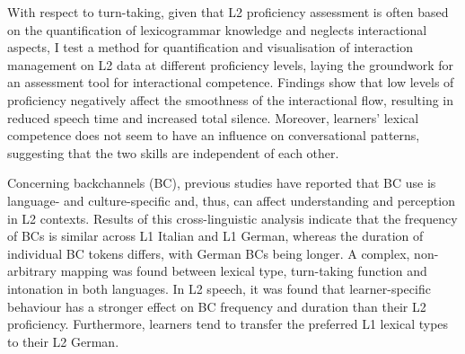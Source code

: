 \begin{stylelsAbstract}
With respect to turn-taking, given that L2 proficiency assessment is often based on the quantification of lexicogrammar knowledge and neglects interactional aspects, I test a method for quantification and visualisation of interaction management on L2 data at different proficiency levels, laying the groundwork for an assessment tool for interactional competence. Findings show that low levels of proficiency negatively affect the smoothness of the interactional flow, resulting in reduced speech time and increased total silence. Moreover, learners’ lexical competence does not seem to have an influence on conversational patterns, suggesting that the two skills are independent of each other.
\end{stylelsAbstract}

\begin{stylelsAbstract}
Concerning backchannels (BC), previous studies have reported that BC use is language- and culture-specific and, thus, can affect understanding and perception in L2 contexts. Results of this cross-linguistic analysis indicate that the frequency of BCs is similar across L1 Italian and L1 German, whereas the duration of individual BC tokens differs, with German BCs being longer. A complex, non-arbitrary mapping was found between lexical type, turn-taking function and intonation in both languages. In L2 speech, it was found that learner-specific behaviour has a stronger effect on BC frequency and duration than their L2 proficiency. Furthermore, learners tend to transfer the preferred L1 lexical types to their L2 German.
\end{stylelsAbstract}

